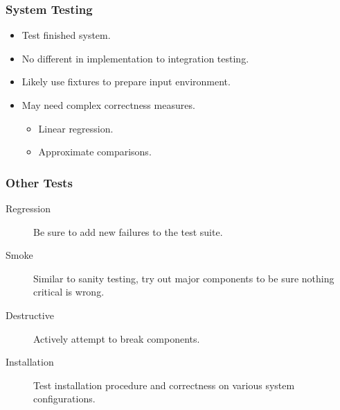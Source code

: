 \begin{frame}
  \frametitle{System Testing}
  \begin{itemize}
  \item Test finished system.
  \vspace{0.3cm}
  \item No different in implementation to integration testing.
  \vspace{0.3cm}
  \item Likely use fixtures to prepare input environment.
  \vspace{0.3cm}
  \item May need complex correctness measures.
    \begin{itemize}
    \item Linear regression.
    \item Approximate comparisons.
    \end{itemize}
  \end{itemize}
\end{frame}

\begin{frame}
  \frametitle{Other Tests}
  \begin{description}
  \item[Regression] Be sure to add new failures to the test suite.
  \item[Smoke] Similar to sanity testing, try out major components to be sure nothing critical is wrong.
  \item[Destructive] Actively attempt to break components.
  \item[Installation] Test installation procedure and correctness on various system configurations.
  \end{description}
\end{frame}

